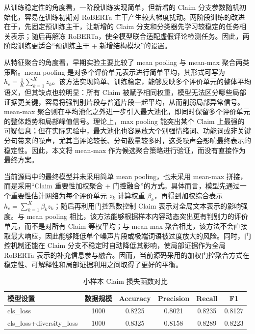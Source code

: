 \documentclass[UTF8,oneside,openright,fontset=none]{ctexbook}
\numberwithin{equation}{chapter}
\begin{document}
从训练稳定性的角度看，一阶段训练实现简单，但新增的 Claim 分支参数随机初始化，容易在训练初期对 RoBERTa 主干产生较大梯度扰动。两阶段训练的改进在于，先固定预训练主干，让新增的 Claim 分支和分类器先学习较稳定的任务相关表示；随后再解冻 RoBERTa，使全模型联合适配虚假评论检测任务。因此，两阶段训练更适合“预训练主干 + 新增结构模块”的设置。

从特征聚合的角度看，早期实验主要比较了 mean pooling 与 mean-max 聚合两类策略。mean pooling 是对多个评价单元表示进行简单平均，其形式可写为 $h_c=\frac{1}{K}\sum_{k=1}^{K}z_k$。该方法实现简单、训练稳定，能够反映多个评价单元的整体平均语义，但其缺点也较明显：所有 Claim 被赋予相同权重，模型无法区分哪些局部证据更关键，容易将强判别片段与普通片段一起平均，从而削弱局部异常信号。mean-max 聚合则在平均池化之外进一步引入最大池化，即同时保留多个评价单元的整体趋势和局部峰值信号。理论上，max pooling 能突出某个 Claim 上最强的可疑信息；但在实际实验中，最大池化也容易放大个别强情绪词、功能词或非关键分句带来的噪声，尤其当评论较长、分句数量较多时，这类噪声会影响最终表示的稳定性。因此，本文将 mean-max 作为候选聚合策略进行验证，而没有直接作为最终方案。

当前源码中的最终模型并未采用简单 mean pooling，也未采用 mean-max 拼接，而是采用“Claim 重要性加权聚合 + 门控融合”的方式。具体而言，模型先通过一个重要性估计网络为每个评价单元 $z_k$ 计算权重 $\beta_k$，再得到加权综合表示 $h_c=\sum_{k=1}^{K}\beta_k z_k$；随后再利用门控系数控制 Claim 表示对全局文本表示的影响强度。与 mean pooling 相比，该方法能够根据样本内容动态突出更有判别力的评价单元，而不是对所有 Claim 等权平均；与 mean-max 聚合相比，该方法不会直接取最大响应，因此能够降低单个噪声片段或极端词语被过度放大的风险。同时，门控机制还能在 Claim 分支不稳定时自动降低其影响，使局部证据作为全局 RoBERTa 表示的补充信息参与融合。因而，当前源码采用的加权门控聚合方式在稳定性、可解释性和局部证据利用之间取得了更好的平衡。

\begin{table}[htbp]
  \centering
  \caption{小样本 Claim 损失函数对比}
  \label{tab:claim-small}
  \begin{tabular}{lccccc}
    \toprule
    模型设置 & 数据规模 & Accuracy & Precision & Recall & F1 \\
    \midrule
    cls\_loss & 1000 & 0.8225 & 0.8021 & 0.8235 & 0.8127 \\
    cls\_loss+diversity\_loss & 1000 & 0.8325 & 0.8158 & 0.8289 & 0.8223 \\
    \bottomrule
  \end{tabular}
\end{table}
\end{document}
